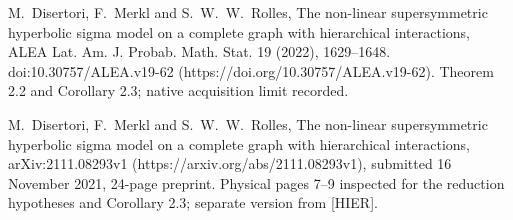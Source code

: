 \documentclass[10pt]{article}
\begin{document}
M. Disertori, F. Merkl and S. W. W. Rolles, The non-linear supersymmetric hyperbolic sigma model on a complete graph with hierarchical interactions, ALEA Lat. Am. J. Probab. Math. Stat. 19 (2022), 1629–1648. doi:10.30757/ALEA.v19-62 (https://doi.org/10.30757/ALEA.v19-62). Theorem 2.2 and Corollary 2.3; native acquisition limit recorded.\par
M. Disertori, F. Merkl and S. W. W. Rolles, The non-linear supersymmetric hyperbolic sigma model on a complete graph with hierarchical interactions, arXiv:2111.08293v1 (https://arxiv.org/abs/2111.08293v1), submitted 16 November 2021, 24-page preprint. Physical pages 7–9 inspected for the reduction hypotheses and Corollary 2.3; separate version from [HIER].\par
\end{document}

